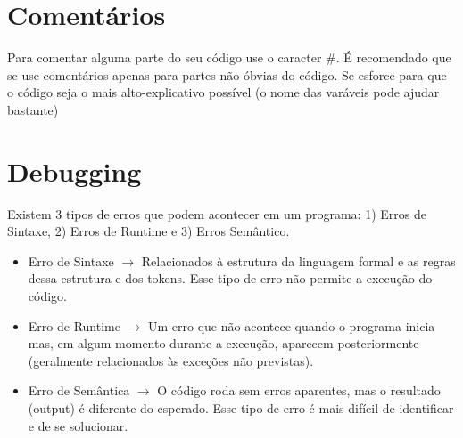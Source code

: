\documentclass[a4paper,11pt]{book}
\begin{document}
\section{Comentários}
Para comentar alguma parte do seu código use o caracter \#. É recomendado que se use comentários apenas para partes não óbvias do código. Se esforce para que o código seja o mais alto-explicativo possível (o nome das varáveis pode ajudar bastante)

\section{Debugging}
Existem 3 tipos de erros que podem acontecer em um programa: 1) Erros de Sintaxe, 2) Erros de Runtime e 3) Erros Semântico.

\begin{itemize}
	\item Erro de Sintaxe $ \rightarrow $ Relacionados à estrutura da linguagem formal e as regras dessa estrutura e dos tokens. Esse tipo de erro não permite a execução do código.
	\item Erro de Runtime $ \rightarrow $ Um erro que não acontece quando o programa inicia mas, em algum momento durante a execução, aparecem posteriormente (geralmente relacionados às exceções não previstas).
	\item Erro de Semântica $ \rightarrow $ O código roda sem erros aparentes, mas o resultado (output) é diferente do esperado. Esse tipo de erro é mais difícil de identificar e de se solucionar. 
\end{itemize}
\end{document}
